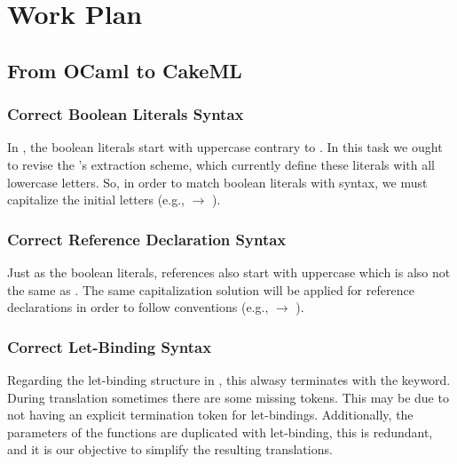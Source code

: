 
%

\chapter{Work Plan}
\label{cha:Work_Plan}

\section{From OCaml to CakeML}

\subsection{Correct Boolean Literals Syntax}

In \cml, the boolean literals start with uppercase contrary to \ocaml. In this task we ought to revise the \whythree's extraction scheme,
which currently define these literals with all lowercase letters. So, in order to match boolean literals with \cml syntax, we must
capitalize the initial letters (e.g.,  $\rightarrow$ ).

\subsection{Correct Reference Declaration Syntax}

Just as the boolean literals, references also start with uppercase which is also not the same as \ocaml. The same capitalization solution 
will be applied for reference declarations in order to follow \cml conventions (e.g.,  $\rightarrow$ ).

\subsection{Correct Let-Binding Syntax}

Regarding the let-binding structure in \cml, this alwasy terminates with the  keyword. During translation sometimes there 
are some missing  tokens. This may be due to \ocaml not having an explicit termination token for let-bindings. Additionally, 
the parameters of the functions are duplicated with let-binding, this is redundant, and it is our objective to simplify the resulting 
translations.

